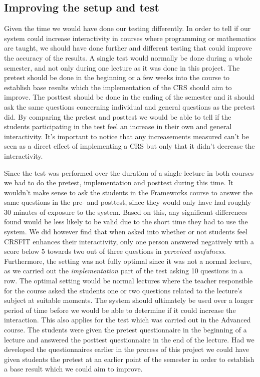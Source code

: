 \subsection{Improving the setup and test}
Given the time we would have done our testing differently. In order to tell if our system could increase interactivity in courses where programming or mathematics are taught, we should have done further and different testing that could improve the accuracy of the results. A single test would normally be done during a whole semester, and not only during one lecture as it was done in this project. The pretest should be done in the beginning or a few weeks into the course to establish base results which the implementation of the CRS should aim to improve. The posttest should be done in the ending of the semester and it should ask the same questions concerning individual and general questions as the pretest did. By comparing the pretest and posttest we would be able to tell if the students participating in the test feel an increase in their own and general interactivity. It's important to notice that any increasements measured can't be seen as a direct effect of implementing a CRS but only that it didn't decrease the interactivity.

Since the test was performed over the duration of a single lecture in both courses we had to do the pretest, implementation and posttest during this time. It wouldn't make sense to ask the students in the Frameworks course to answer the same questions in the pre- and posttest, since they would only have had roughly 30 minutes of exposure to the system. Based on this, any significant differences found would be less likely to be valid due to the short time they had to use the system. We did however find that when asked into whether or not students feel CRSFIT enhances their interactivity, only one person answered negatively with a score below 5 towards two out of three questions in \emph{perceived usefulness}. Furthermore, the setting was not fully optimal since it was not a normal lecture, as we carried out the \emph{implementation} part of the test asking 10 questions in a row. The optimal setting would be normal lectures where the teacher responsible for the course asked the students one or two questions related to the lecture's subject at suitable moments. The system should ultimately be used over a longer period of time before we would be able to determine if it could increase the interaction. This also applies for the test which was carried out in the Advanced course. The students were given the pretest questionnaire in the beginning of a lecture and answered the posttest questionnaire in the end of the lecture. Had we developed the questionnaires earlier in the process of this project we could have given students the pretest at an earlier point of the semester in order to establish a base result which we could aim to improve.

